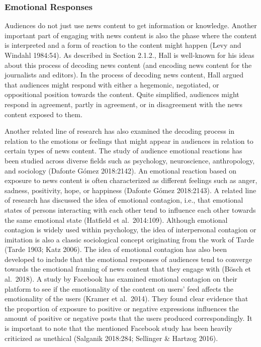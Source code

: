 \documentclass[
]{article}
\begin{document}
\hypertarget{emotional-responses}{%
\subsubsection{Emotional Responses}\label{emotional-responses}}

\noindent Audiences do not just use news content to get information or
knowledge. Another important part of engaging with news content is also
the phase where the content is interpreted and a form of reaction to the
content might happen (Levy and Windahl 1984:54). As described in Section
2.1.2., Hall is well-known for his ideas about this process of decoding
news content (and encoding news content for the journalists and
editors). In the process of decoding news content, Hall argued that
audiences might respond with either a hegemonic, negotiated, or
oppositional position towards the content. Quite simplified, audiences
might respond in agreement, partly in agreement, or in disagreement with
the news content exposed to them.

Another related line of research has also examined the decoding process
in relation to the emotions or feelings that might appear in audiences
in relation to certain types of news content. The study of audience
emotional reactions has been studied across diverse fields such as
psychology, neuroscience, anthropology, and sociology (Dafonte Gómez
2018:2142). An emotional reaction based on exposure to news content is
often characterized as different feelings such as anger, sadness,
positivity, hope, or happiness (Dafonte Gómez 2018:2143). A related line
of research has discussed the idea of emotional contagion, i.e., that
emotional states of persons interacting with each other tend to
influence each other towards the same emotional state (Hatfield et
al.~2014:109). Although emotional contagion is widely used within
psychology, the idea of interpersonal contagion or imitation is also a
classic sociological concept originating from the work of Tarde (Tarde
1903; Katz 2006). The idea of emotional contagion has also been
developed to include that the emotional responses of audiences tend to
converge towards the emotional framing of news content that they engage
with (Bösch et al.~2018). A study by Facebook has examined emotional
contagion on their platform to see if the emotionality of the content on
users' feed affects the emotionality of the users (Kramer et al.~2014).
They found clear evidence that the proportion of exposure to positive or
negative expressions influences the amount of positive or negative posts
that the users produced correspondingly. It is important to note that
the mentioned Facebook study has been heavily criticized as unethical
(Salganik 2018:284; Sellinger \& Hartzog 2016).
\end{document}
